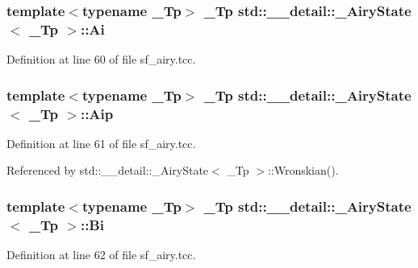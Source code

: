 \subsubsection[{\texorpdfstring{Ai}{Ai}}]{\setlength{\rightskip}{0pt plus 5cm}template$<$typename \+\_\+\+Tp$>$ \+\_\+\+Tp {\bf std\+::\+\_\+\+\_\+detail\+::\+\_\+\+Airy\+State}$<$ \+\_\+\+Tp $>$\+::Ai}\hypertarget{structstd_1_1____detail_1_1__AiryState_a9d5374d09f020d9cf0c46f1e4d2568dc}{}\label{structstd_1_1____detail_1_1__AiryState_a9d5374d09f020d9cf0c46f1e4d2568dc}


Definition at line 60 of file sf\+\_\+airy.\+tcc.

\subsubsection[{\texorpdfstring{Aip}{Aip}}]{\setlength{\rightskip}{0pt plus 5cm}template$<$typename \+\_\+\+Tp$>$ \+\_\+\+Tp {\bf std\+::\+\_\+\+\_\+detail\+::\+\_\+\+Airy\+State}$<$ \+\_\+\+Tp $>$\+::Aip}\hypertarget{structstd_1_1____detail_1_1__AiryState_aeecc49a563e8261c6d1f77b285df42ee}{}\label{structstd_1_1____detail_1_1__AiryState_aeecc49a563e8261c6d1f77b285df42ee}


Definition at line 61 of file sf\+\_\+airy.\+tcc.



Referenced by std\+::\+\_\+\+\_\+detail\+::\+\_\+\+Airy\+State$<$ \+\_\+\+Tp $>$\+::\+Wronskian().

\subsubsection[{\texorpdfstring{Bi}{Bi}}]{\setlength{\rightskip}{0pt plus 5cm}template$<$typename \+\_\+\+Tp$>$ \+\_\+\+Tp {\bf std\+::\+\_\+\+\_\+detail\+::\+\_\+\+Airy\+State}$<$ \+\_\+\+Tp $>$\+::Bi}\hypertarget{structstd_1_1____detail_1_1__AiryState_a1df8de2b3b56ac379825c540452260a4}{}\label{structstd_1_1____detail_1_1__AiryState_a1df8de2b3b56ac379825c540452260a4}


Definition at line 62 of file sf\+\_\+airy.\+tcc.

